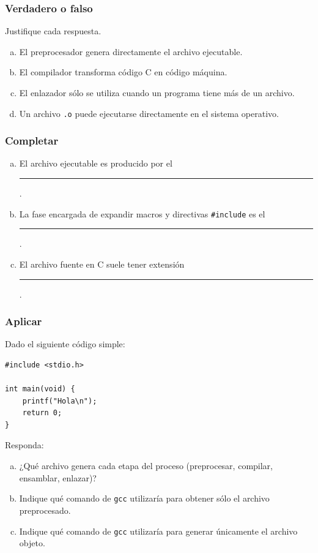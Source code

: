 \subsubsection{Verdadero o falso}
Justifique cada respuesta.
\begin{enumerate}[a)]
  \item El preprocesador genera directamente el archivo ejecutable. \\
        \vspace{0.5cm}
  \item El compilador transforma código C en código máquina. \\
        \vspace{0.5cm}
  \item El enlazador sólo se utiliza cuando un programa tiene más de un archivo. \\
        \vspace{0.5cm}
  \item Un archivo \texttt{.o} puede ejecutarse directamente en el sistema operativo. \\
        \vspace{0.5cm}
\end{enumerate}

\subsubsection{Completar}
\begin{enumerate}[a)]
  \item El archivo ejecutable es producido por el \rule{5cm}{0.1pt}.
  \item La fase encargada de expandir macros y directivas \texttt{\#include} es el \rule{1cm}{0.1pt}.
  \item El archivo fuente en C suele tener extensión \rule{5cm}{0.1pt}.
\end{enumerate}

\subsubsection{Aplicar}
Dado el siguiente código simple:

\begin{verbatim}
#include <stdio.h>

int main(void) {
    printf("Hola\n");
    return 0;
}
\end{verbatim}

Responda:
\begin{enumerate}[a)]
  \item ¿Qué archivo genera cada etapa del proceso (preprocesar, compilar, ensamblar, enlazar)?
  \item Indique qué comando de \texttt{gcc} utilizaría para obtener sólo el archivo preprocesado.
  \item Indique qué comando de \texttt{gcc} utilizaría para generar únicamente el archivo objeto.
\end{enumerate}

